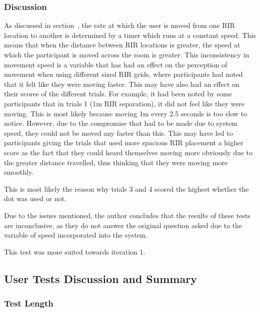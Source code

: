\documentclass[../../main.tex]{subfiles}
\begin{document}
			\subsubsection{Discussion}

			As discussed in section~, the rate at which the user is moved from one \ac{RIR} location to another is determined by a timer which runs at a constant speed. This means that when the distance between \ac{RIR} locations is greater, the speed at which the participant is moved across the room is greater. This inconsistency in movement speed is a variable that has had an effect on the perception of movement when using different sized \ac{RIR} grids, where participants had noted that it felt like they were moving faster. This may have also had an effect on their scores of the different trials. For example, it had been noted by some participants that in trials 1 (1m \ac{RIR} separation), it did not feel like they were moving. This is most likely because moving 1m every 2.5 seconds is too slow to notice. However, due to the compromise that had to be made due to system speed, they could not be moved any faster than this. This may have led to participants giving the trials that used more spacious \ac{RIR} placement a higher score as the fact that they could heard themselves moving more obviously due to the greater distance travelled, thus thinking that they were moving more smoothly.

			This is most likely the reason why trials 3 and 4 scored the highest whether the dot was used or not.

			Due to the issues mentioned, the author concludes that the results of these tests are inconclusive, as they do not answer the original question asked due to the variable of speed incorporated into the system.

			This test was more suited towards iteration 1.

		\subsection{User Tests Discussion and Summary}

			\subsubsection{Test Length}
\end{document}
